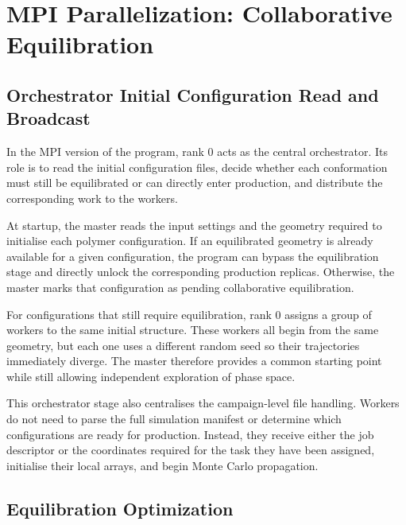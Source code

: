 
\section{MPI Parallelization: Collaborative Equilibration}
\label{sec:mpi_collab}

\subsection{Orchestrator Initial Configuration Read and Broadcast}

In the MPI version of the program, rank 0 acts as the central
orchestrator. Its role is to read the initial configuration files,
decide whether each conformation must still be equilibrated or can
directly enter production, and distribute the corresponding work to the
workers.

At startup, the master reads the input settings and the geometry
required to initialise each polymer configuration. If an equilibrated
geometry is already available for a given configuration, the program can
bypass the equilibration stage and directly unlock the corresponding
production replicas. Otherwise, the master marks that configuration as
pending collaborative equilibration.

For configurations that still require equilibration, rank 0 assigns a
group of workers to the same initial structure. These workers all begin
from the same geometry, but each one uses a different random seed so
their trajectories immediately diverge. The master therefore provides a
common starting point while still allowing independent exploration of
phase space.

This orchestrator stage also centralises the campaign-level file
handling. Workers do not need to parse the full simulation manifest or
determine which configurations are ready for production. Instead, they
receive either the job descriptor or the coordinates required for the
task they have been assigned, initialise their local arrays, and begin
Monte Carlo propagation.

\subsection{Equilibration Optimization}


